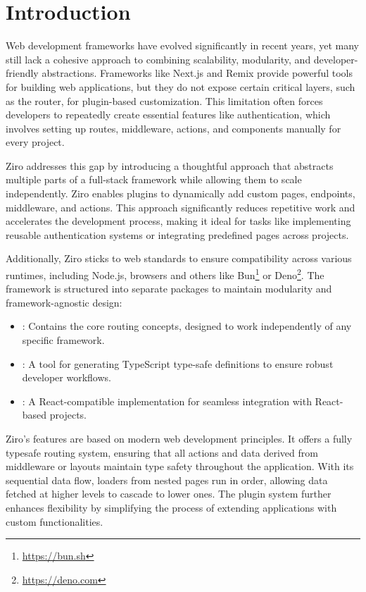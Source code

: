 \section{Introduction}

Web development frameworks have evolved significantly in recent years, yet many still lack a cohesive approach to combining scalability, modularity, and developer-friendly abstractions. Frameworks like Next.js and Remix provide powerful tools for building web applications, but they do not expose certain critical layers, such as the router, for plugin-based customization. This limitation often forces developers to repeatedly create essential features like authentication, which involves setting up routes, middleware, actions, and components manually for every project.

Ziro addresses this gap by introducing a thoughtful approach that abstracts multiple parts of a full-stack framework while allowing them to scale independently. Ziro enables plugins to dynamically add custom pages, endpoints, middleware, and actions. This approach significantly reduces repetitive work and accelerates the development process, making it ideal for tasks like implementing reusable authentication systems or integrating predefined pages across projects.

Additionally, Ziro sticks to web standards to ensure compatibility across various runtimes, including Node.js, browsers and others like Bun\footnote{\url{https://bun.sh}} or Deno\footnote{\url{https://deno.com}}. The framework is structured into separate packages to maintain modularity and framework-agnostic design:

\begin{itemize}
	\item {}: Contains the core routing concepts, designed to work independently of any specific framework.

	\item {}: A tool for generating TypeScript type-safe definitions to ensure robust developer workflows.

	\item {}: A React-compatible implementation for seamless integration with React-based projects.
\end{itemize}

Ziro’s features are based on modern web development principles. It offers a fully typesafe routing system, ensuring that all actions and data derived from middleware or layouts maintain type safety throughout the application. With its sequential data flow, loaders from nested pages run in order, allowing data fetched at higher levels to cascade to lower ones. The plugin system further enhances flexibility by simplifying the process of extending applications with custom functionalities.

